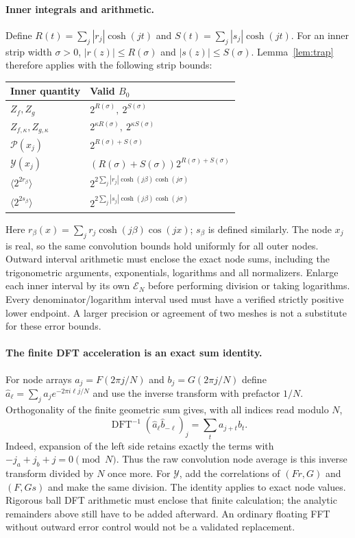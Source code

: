 \paragraph{Inner integrals and arithmetic.}
Define $R(t)=\sum_j|r_j|\cosh(jt)$ and
$S(t)=\sum_j|s_j|\cosh(jt)$. For an inner strip width $\sigma>0$,
$|r(z)|\le R(\sigma)$ and $|s(z)|\le S(\sigma)$.
Lemma~\ref{lem:trap} therefore applies with the following strip bounds:
\begin{center}\small
\begin{tabular}{ll}\toprule
Inner quantity & Valid $B_0$\\\midrule
$Z_f,Z_g$ & $2^{R(\sigma)},\ 2^{S(\sigma)}$\\
$Z_{f,\kappa},Z_{g,\kappa}$ & $2^{\kappa R(\sigma)},\ 2^{\kappa S(\sigma)}$\\
$\mathcal P(x_j)$ & $2^{R(\sigma)+S(\sigma)}$\\
$\mathcal Y(x_j)$ & $(R(\sigma)+S(\sigma))2^{R(\sigma)+S(\sigma)}$\\
$\langle2^{2r_\beta}\rangle$ &
 $2^{2\sum_j|r_j|\cosh(j\beta)\cosh(j\sigma)}$\\
$\langle2^{2s_\beta}\rangle$ &
 $2^{2\sum_j|s_j|\cosh(j\beta)\cosh(j\sigma)}$\\\bottomrule
\end{tabular}
\end{center}
Here $r_\beta(x)=\sum_jr_j\cosh(j\beta)\cos(jx)$; $s_\beta$ is
defined similarly. The node $x_j$ is real, so the same convolution bounds
hold uniformly for all outer nodes.
Outward interval arithmetic must enclose the exact node sums, including
the trigonometric arguments, exponentials, logarithms and all normalizers.
Enlarge each inner interval by its own $\mathcal E_N$ before performing
division or taking logarithms. Every denominator/logarithm interval used
must have a verified strictly positive lower endpoint. A larger precision
or agreement of two meshes is not a substitute for these error bounds.

\paragraph{The finite DFT acceleration is an exact sum identity.}
For node arrays $a_j=F(2\pi j/N)$ and $b_j=G(2\pi j/N)$ define
$\widehat a_\ell=\sum_j a_j e^{-2\pi i\ell j/N}$ and use the inverse
transform with prefactor $1/N$. Orthogonality of the finite geometric
sum gives, with all indices read modulo $N$,
\[
 \operatorname{DFT}^{-1}
       (\widehat a_\ell\widehat b_{-\ell})_j
 =\sum_t a_{j+t}b_t.
\]
Indeed, expansion of the left side retains exactly the terms with
$-j_a+j_b+j=0\pmod N$. Thus the raw convolution node average is this
inverse transform divided by $N$ once more. For $\mathcal Y$, add the
correlations of $(Fr,G)$ and $(F,Gs)$ and make the same division.
The identity applies to exact node values. Rigorous ball DFT arithmetic
must enclose that finite calculation; the analytic remainders above
still have to be added afterward. An ordinary floating FFT without
outward error control would not be a validated replacement.

